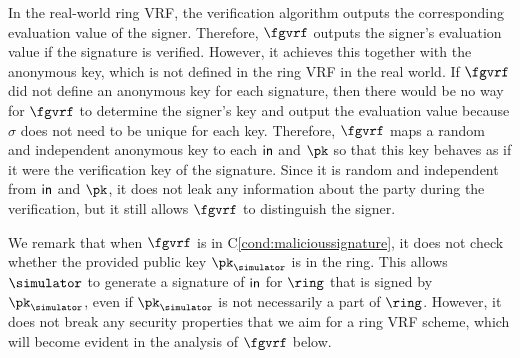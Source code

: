 	In the real-world ring VRF, the verification algorithm outputs the corresponding evaluation value of the signer. Therefore, $ \fgvrf $  outputs the signer's evaluation value if the signature is verified. However, it achieves this together with the anonymous key, which is not defined in the ring VRF in the real world.  If $ \fgvrf $ did not define an anonymous key for  each signature, then there would be no way for $ \fgvrf $ to determine the signer's key and output the evaluation value because $ \sigma $ does not need to be unique for each key. Therefore, $ \fgvrf $ maps a random and independent anonymous key to each $ \mathsf{in} $ and $ \pk $ so that this key behaves as if it were the verification key of the signature. Since it  is  random and independent from $ \mathsf{in} $ and $ \pk $, it does not leak any information about the party during the verification, but it still allows $ \fgvrf $ to distinguish the signer.
	
	We remark that when $ \fgvrf $ is in C\ref{cond:malicioussignature}, it does not check whether the provided public key $ \pk_\simulator $ is in the ring. This allows $\simulator$ to generate a signature of $\mathsf{in}$ for $\ring$ that is signed by $\pk_\simulator$, even if $\pk_\simulator$ is not necessarily a part of $\ring$. However, it does not break any security properties that we aim for a ring VRF scheme, which will become evident in the analysis of $ \fgvrf $ below.
	
